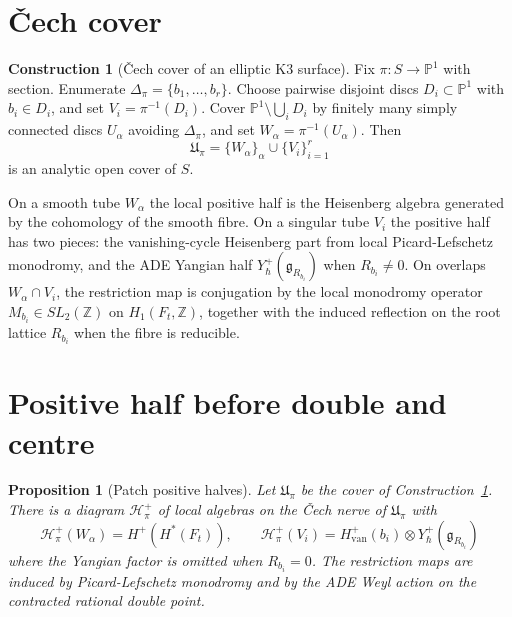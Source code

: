 \documentclass[11pt]{article}
\theoremstyle{plain}
\newtheorem{proposition}[theorem]{Proposition}
\theoremstyle{definition}
\newtheorem{construction}[theorem]{Construction}
\theoremstyle{remark}
\providecommand{\PP}{\mathbb{P}}
\providecommand{\ZZ}{\mathbb{Z}}
\providecommand{\Ybold}{Y}
\providecommand{\frakg}{\mathfrak{g}}
\providecommand{\Root}{R}
\begin{document}
\section{\v{C}ech cover}

\begin{construction}[\v{C}ech cover of an elliptic K3 surface]
\label{constr:k3-elliptic-cover}
Fix $\pi\colon S\to\PP^1$ with section. Enumerate
$\Delta_\pi=\{b_1,\ldots,b_r\}$. Choose pairwise disjoint discs
$D_i\subset\PP^1$ with $b_i\in D_i$, and set $V_i=\pi^{-1}(D_i)$.
Cover $\PP^1\setminus\bigcup_i D_i$ by finitely many simply connected
discs $U_\alpha$ avoiding $\Delta_\pi$, and set
$W_\alpha=\pi^{-1}(U_\alpha)$. Then
\[
 \mathfrak U_\pi=\{W_\alpha\}_\alpha\cup\{V_i\}_{i=1}^r
\]
is an analytic open cover of $S$.
\end{construction}

On a smooth tube $W_\alpha$ the local positive half is the Heisenberg
algebra generated by the cohomology of the smooth fibre. On a singular
tube $V_i$ the positive half has two pieces: the vanishing-cycle
Heisenberg part from local Picard-Lefschetz monodromy, and the ADE
Yangian half $\Ybold^+_\hbar(\frakg_{\Root_{b_i}})$ when
$\Root_{b_i}\neq 0$. On overlaps $W_\alpha\cap V_i$, the restriction
map is conjugation by the local monodromy operator
$M_{b_i}\in SL_2(\ZZ)$ on $H_1(F_t,\ZZ)$, together with the induced
reflection on the root lattice $\Root_{b_i}$ when the fibre is
reducible.

\section{Positive half before double and centre}

\begin{proposition}[Patch positive halves]
\label{prop:patch-positive-halves}
Let $\mathfrak U_\pi$ be the cover of
Construction~\ref{constr:k3-elliptic-cover}. There is a diagram
$\mathcal H^+_\pi$ of local algebras on the \v{C}ech nerve of
$\mathfrak U_\pi$ with
\[
 \mathcal H^+_\pi(W_\alpha)=H^+(H^*(F_t)),\qquad
 \mathcal H^+_\pi(V_i)=
 H^+_{\mathrm{van}}(b_i)\otimes
 \Ybold^+_\hbar(\frakg_{\Root_{b_i}})
\]
where the Yangian factor is omitted when $\Root_{b_i}=0$. The
restriction maps are induced by Picard-Lefschetz monodromy and by
the ADE Weyl action on the contracted rational double point.
\end{proposition}
\end{document}
